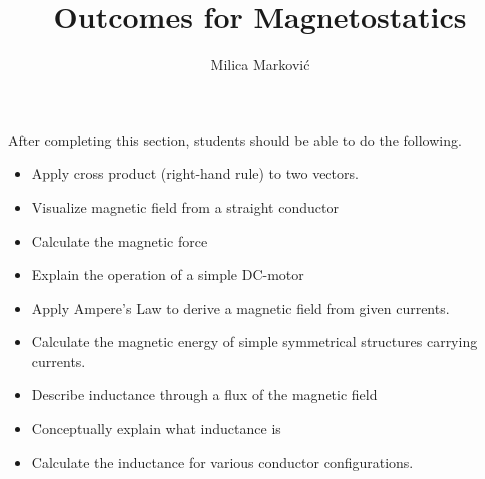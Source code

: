 \documentclass{ximera}
\title{Outcomes for Magnetostatics}
\author{Milica Markovi{\'c}}
\begin{document}
\begin{abstract}
\end{abstract}

\maketitle

\begin{sectionOutcomes}

After completing this section, students should be able to do the following.

\begin{itemize}
\item Apply cross product (right-hand rule) to two vectors.
\item Visualize magnetic field from a straight conductor
\item Calculate the magnetic force
\item Explain the operation of a simple DC-motor
\item Apply Ampere's Law to derive a magnetic field from given currents.
\item Calculate the magnetic energy of simple symmetrical structures carrying currents.
\item Describe inductance through a flux of the magnetic field
\item Conceptually explain what inductance is
\item Calculate the inductance for various conductor configurations.
\end{itemize}

\end{sectionOutcomes}
\end{document}
